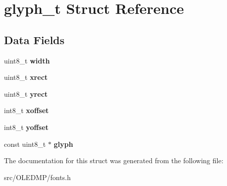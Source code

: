 \hypertarget{structglyph__t}{\section{glyph\+\_\+t Struct Reference}
\label{structglyph__t}
}
\subsection*{Data Fields}
\begin{DoxyCompactItemize}
\item 
\hypertarget{structglyph__t_a09a2a45f731b02946ff6d3cd15c1a476}{uint8\+\_\+t {\bfseries width}}\label{structglyph__t_a09a2a45f731b02946ff6d3cd15c1a476}

\item 
\hypertarget{structglyph__t_a46d1f5dd7c1a75b29bd8ff4572263129}{uint8\+\_\+t {\bfseries xrect}}\label{structglyph__t_a46d1f5dd7c1a75b29bd8ff4572263129}

\item 
\hypertarget{structglyph__t_a59c390ac18717a7ff28f85cc8a829a8e}{uint8\+\_\+t {\bfseries yrect}}\label{structglyph__t_a59c390ac18717a7ff28f85cc8a829a8e}

\item 
\hypertarget{structglyph__t_a248c78bc36899ea7581e379d926f480a}{int8\+\_\+t {\bfseries xoffset}}\label{structglyph__t_a248c78bc36899ea7581e379d926f480a}

\item 
\hypertarget{structglyph__t_a1f3726a53d108483e5f64b4cf1edda88}{int8\+\_\+t {\bfseries yoffset}}\label{structglyph__t_a1f3726a53d108483e5f64b4cf1edda88}

\item 
\hypertarget{structglyph__t_a2bad71d1abe181892d7ec3a7223b0035}{const uint8\+\_\+t $\ast$ {\bfseries glyph}}\label{structglyph__t_a2bad71d1abe181892d7ec3a7223b0035}

\end{DoxyCompactItemize}


The documentation for this struct was generated from the following file\+:\begin{DoxyCompactItemize}
\item 
src/\+O\+L\+E\+D\+M\+P/fonts.\+h\end{DoxyCompactItemize}
